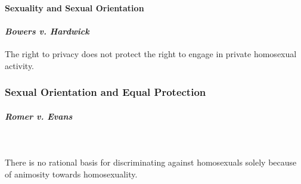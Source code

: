 \paragraph{Sexuality and Sexual Orientation}
 
\paragraph{\emph{Bowers v. Hardwick}}

The right to privacy does not protect the right to engage in private 
homosexual activity.

\subsubsection{Sexual Orientation and Equal Protection}

\paragraph{\emph{Romer v. Evans}}
~\\\\
There is no rational basis for discriminating against homosexuals solely 
because of animosity towards homosexuality.

